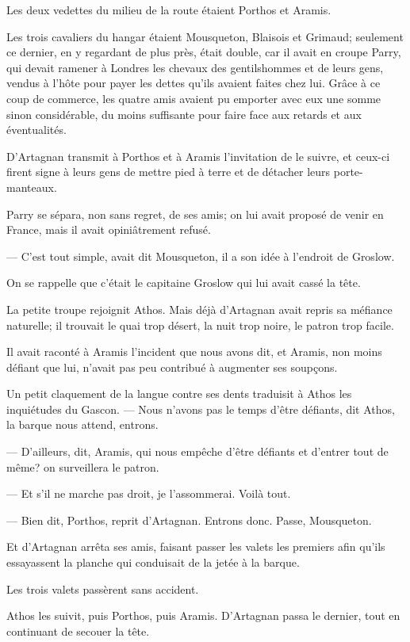 Les deux vedettes du milieu de la route étaient Porthos et Aramis.

Les trois cavaliers du hangar étaient Mousqueton, Blaisois et Grimaud; seulement ce dernier, en y regardant de plus près, était double, car il avait en croupe Parry, qui devait ramener à Londres les chevaux des gentilshommes et de leurs gens, vendus à l'hôte pour payer les dettes qu'ils avaient faites chez lui. Grâce à ce coup de commerce, les quatre amis avaient pu emporter avec eux une somme sinon considérable, du moins suffisante pour faire face aux retards et aux éventualités.

D'Artagnan transmit à Porthos et à Aramis l'invitation de le suivre, et ceux-ci firent signe à leurs gens de mettre pied à terre et de détacher leurs porte-manteaux.

Parry se sépara, non sans regret, de ses amis; on lui avait proposé de venir en France, mais il avait opiniâtrement refusé.

— C'est tout simple, avait dit Mousqueton, il a son idée à l'endroit de Groslow.

On se rappelle que c'était le capitaine Groslow qui lui avait cassé la tête.

La petite troupe rejoignit Athos. Mais déjà d'Artagnan avait repris sa méfiance naturelle; il trouvait le quai trop désert, la nuit trop noire, le patron trop facile.

Il avait raconté à Aramis l'incident que nous avons dit, et Aramis, non moins défiant que lui, n'avait pas peu contribué à augmenter ses soupçons.

Un petit claquement de la langue contre ses dents traduisit à Athos les inquiétudes du Gascon.
— Nous n'avons pas le temps d'être défiants, dit Athos, la barque nous attend, entrons.

— D'ailleurs, dit, Aramis, qui nous empêche d'être défiants et d'entrer tout de même? on surveillera le patron.

— Et s'il ne marche pas droit, je l'assommerai. Voilà tout.

— Bien dit, Porthos, reprit d'Artagnan. Entrons donc. Passe, Mousqueton.

Et d'Artagnan arrêta ses amis, faisant passer les valets les premiers afin qu'ils essayassent la planche qui conduisait de la jetée à la barque.

Les trois valets passèrent sans accident.

Athos les suivit, puis Porthos, puis Aramis. D'Artagnan passa le dernier, tout en continuant de secouer la tête.

